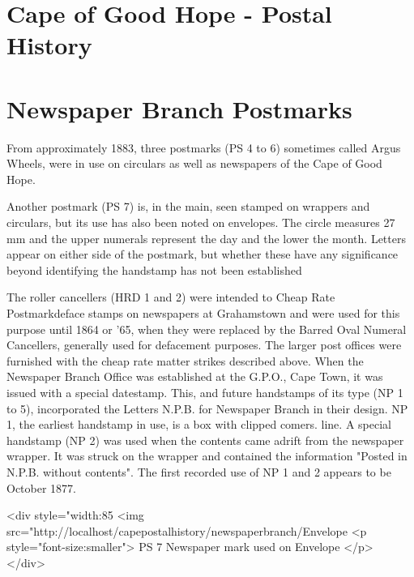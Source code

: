 \section{Cape of Good Hope - Postal History 
} 
\section{Newspaper Branch Postmarks}


 


From approximately 1883, three postmarks (PS 4 to 6) sometimes called Argus Wheels, were in use on circulars as well as newspapers of the Cape of Good Hope.  



Another postmark (PS 7) is, in the main, seen stamped on wrappers and circulars, but its use has also been noted on envelopes. The circle measures 27 mm and the upper numerals represent the day and the lower the month. Letters appear on either side of the postmark, but whether these have any significance beyond identifying the handstamp has not been established

The roller cancellers (HRD 1 and 2) were intended to Cheap Rate Postmarkdeface stamps on newspapers at Grahamstown and were used for this purpose until 1864 or '65, when they were replaced by the Barred Oval Numeral Cancellers, generally used for defacement purposes.  The larger post offices were furnished with the cheap rate matter strikes described above. When the Newspaper Branch Office was established at the G.P.O., Cape Town, it was issued with a special datestamp. This, and future handstamps of its type (NP 1 to 5), incorporated the Letters N.P.B. for Newspaper Branch in their design. NP 1, the earliest handstamp in use, is a box with clipped comers. line. A special handstamp (NP 2) was used when the contents came adrift from the newspaper wrapper. It was struck on the wrapper and contained the information "Posted in N.P.B. without contents". The first recorded use of NP 1 and 2 appears to be October 1877. 

<div style="width:85%
<img src="http://localhost/capepostalhistory/newspaperbranch/Envelope%
<p style="font-size:smaller"> 
PS 7 Newspaper mark used on Envelope
</p>
</div> 

